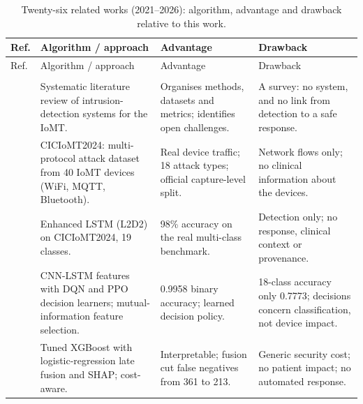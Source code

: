 \documentclass[preprint,12pt]{elsarticle}
\begin{document}
\small
\begin{longtable}{@{}C{0.8cm}L{3.6cm}L{3.6cm}L{4.2cm}@{}}
\caption{Twenty-six related works (2021--2026): algorithm, advantage and drawback relative to this work.}\label{tab:lit}\\
\toprule
Ref. & Algorithm / approach & Advantage & Drawback \\
\midrule
\endfirsthead
\toprule
Ref. & Algorithm / approach & Advantage & Drawback \\
\midrule
\endhead
\bottomrule
\endfoot
{}\\*
\cite{naghib2025} & Systematic literature review of intrusion-detection systems for the IoMT. & Organises methods, datasets and metrics; identifies open challenges. & A survey: no system, and no link from detection to a safe response. \\
\cite{dadkhah2024} & CICIoMT2024: multi-protocol attack dataset from 40 IoMT devices (WiFi, MQTT, Bluetooth). & Real device traffic; 18 attack types; official capture-level split. & Network flows only; no clinical information about the devices. \\
\cite{akar2025} & Enhanced LSTM (L2D2) on CICIoMT2024, 19 classes. & 98\% accuracy on the real multi-class benchmark. & Detection only; no response, clinical context or provenance. \\
\cite{shaikh2025} & CNN-LSTM features with DQN and PPO decision learners; mutual-information feature selection. & 0.9958 binary accuracy; learned decision policy. & 18-class accuracy only 0.7773; decisions concern classification, not device impact. \\
\cite{hafid2025} & Tuned XGBoost with logistic-regression late fusion and SHAP; cost-aware. & Interpretable; fusion cut false negatives from 361 to 213. & Generic security cost; no patient impact; no automated response. \\

\end{longtable}
\end{document}
